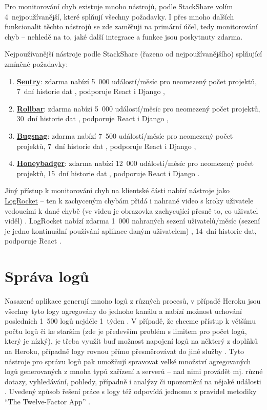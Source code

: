 Pro monitorování chyb existuje mnoho nástrojů, podle StackShare \cite{stackshare-exception} volím 4~nejpoužívanější, které splňují všechny požadavky. I přes mnoho dalších funkcionalit těchto nástrojů se zde zaměřuji na primární účel, tedy monitorování chyb -- nehledě na to, jaké další integrace a funkce jsou poskytnuty zdarma.

Nejpoužívanější nástroje podle StackShare (řazeno od nejpoužívanějšího) \cite{stackshare-exception} splňující zmíněné požadavky:
\begin{enumerate}
    \item \href{https://sentry.io/}{\textbf{Sentry}}: zdarma nabízí 5~000 událostí/měsíc pro neomezený počet projektů, 7~dní historie dat \cite{sentry-pricing}, podporuje React i Django \cite{sentry-platforms},
    \item \href{https://rollbar.com/}{\textbf{Rollbar}}: zdarma nabízí 5~000 událostí/měsíc pro neomezený počet projektů, 30~dní historie dat \cite{rollbar-pricing}, podporuje React i Django \cite{rollbar-platforms},
    \item \href{https://www.bugsnag.com/}{\textbf{Bugsnag}}: zdarma nabízí 7~500 událostí/měsíc pro neomezený počet projektů, 7~dní historie dat \cite{bugsnag-pricing}, podporuje React i Django \cite{bugsnag-platforms},
    \item \href{https://www.honeybadger.io/}{\textbf{Honeybadger}}: zdarma nabízí 12~000 událostí/měsíc pro neomezený počet projektů, 15~dní historie dat \cite{honeybadger-pricing}, podporuje React \cite{honeybadger-react} i Django \cite{honeybadger-django}.
\end{enumerate}

Jiný přístup k monitorování chyb na klientské části nabízí nástroje jako \href{https://logrocket.com/}{LogRocket} -- ten k zachyceným chybám přidá i nahrané video s kroky uživatele vedoucími k dané chybě (ve videu je obrazovka zachycující přesně to, co uživatel viděl) \cite{logrocket}. LogRocket nabízí zdarma 1~000 nahraných sezení uživatelů/měsíc (sezení je jedno kontinuální používání aplikace daným uživatelem) \cite{logrocket-pricing}, 14~dní historie dat, podporuje React \cite{logrocket-react}.

\section{Správa logů}\label{sec:spravalogu}
Nasazené aplikace generují mnoho logů z různých procesů, v případě Heroku jsou všechny tyto logy agregovány do jednoho kanálu a nabízí možnost uchování posledních 1~500 logů nejdéle 1~týden \cite{tools-logs1}. V případě, že chceme přístup k většímu počtu logů či ke starším (zde je především problém s limitem pro počet logů, který je nízký), je třeba využít buď možnost napojení logů na některý z doplňků na Heroku, případně logy rovnou přímo přesměrovávat do jiné služby \cite{tools-logs1}. Tyto nástroje pro správu logů pak umožňují spravovat velké množství agregovaných logů generovaných z mnoha typů zařízení a serverů -- nad nimi provádět mj. různé dotazy, vyhledávání, pohledy, případně i analýzy či upozornění na nějaké události \cite{tools-logs2}. Uvedený způsob řešení práce s logy též odpovídá jednomu z pravidel metodiky \enquote{The Twelve-Factor App} \cite{12factor}.

